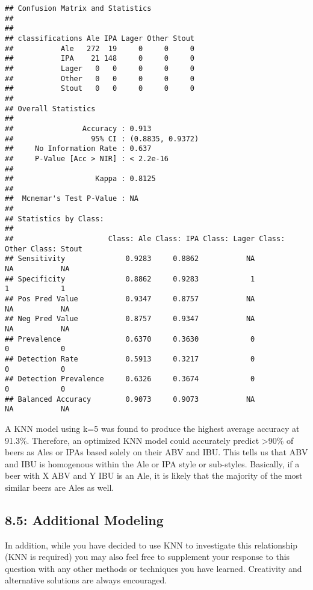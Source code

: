 \documentclass[
]{article}
\begin{document}
\begin{verbatim}
## Confusion Matrix and Statistics
## 
##                
## classifications Ale IPA Lager Other Stout
##           Ale   272  19     0     0     0
##           IPA    21 148     0     0     0
##           Lager   0   0     0     0     0
##           Other   0   0     0     0     0
##           Stout   0   0     0     0     0
## 
## Overall Statistics
##                                           
##                Accuracy : 0.913           
##                  95% CI : (0.8835, 0.9372)
##     No Information Rate : 0.637           
##     P-Value [Acc > NIR] : < 2.2e-16       
##                                           
##                   Kappa : 0.8125          
##                                           
##  Mcnemar's Test P-Value : NA              
## 
## Statistics by Class:
## 
##                      Class: Ale Class: IPA Class: Lager Class: Other Class: Stout
## Sensitivity              0.9283     0.8862           NA           NA           NA
## Specificity              0.8862     0.9283            1            1            1
## Pos Pred Value           0.9347     0.8757           NA           NA           NA
## Neg Pred Value           0.8757     0.9347           NA           NA           NA
## Prevalence               0.6370     0.3630            0            0            0
## Detection Rate           0.5913     0.3217            0            0            0
## Detection Prevalence     0.6326     0.3674            0            0            0
## Balanced Accuracy        0.9073     0.9073           NA           NA           NA
\end{verbatim}

A KNN model using k=5 was found to produce the highest average accuracy
at 91.3\%. Therefore, an optimized KNN model could accurately predict
\textgreater90\% of beers as Ales or IPAs based solely on their ABV and
IBU. This tells us that ABV and IBU is homogenous within the Ale or IPA
style or sub-styles. Basically, if a beer with X ABV and Y IBU is an
Ale, it is likely that the majority of the most similar beers are Ales
as well.

\hypertarget{additional-modeling}{%
\subsection{8.5: Additional Modeling}\label{additional-modeling}}

In addition, while you have decided to use KNN to investigate this
relationship (KNN is required) you may also feel free to supplement your
response to this question with any other methods or techniques you have
learned. Creativity and alternative solutions are always encouraged.
\end{document}
